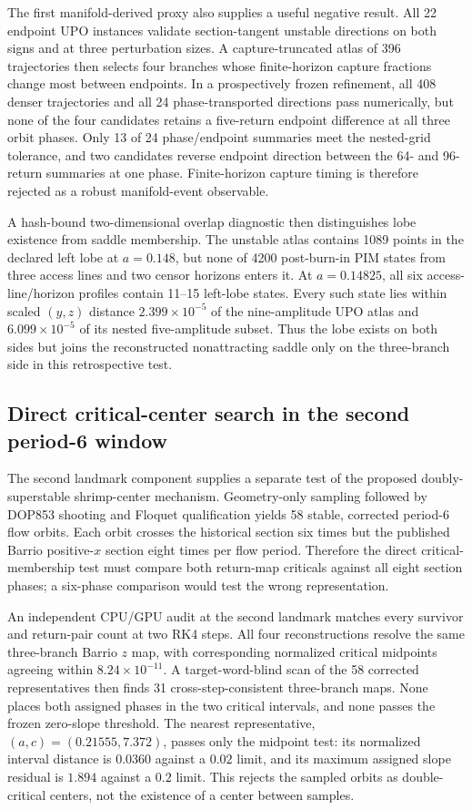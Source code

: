 The first manifold-derived proxy also supplies a useful negative result.  All
22 endpoint UPO instances validate section-tangent unstable directions on both
signs and at three perturbation sizes.  A capture-truncated atlas of 396
trajectories then selects four branches whose finite-horizon capture fractions
change most between endpoints.  In a prospectively frozen refinement, all 408
denser trajectories and all 24 phase-transported directions pass numerically,
but none of the four candidates retains a five-return endpoint difference at
all three orbit phases.  Only 13 of 24 phase/endpoint summaries meet the
nested-grid tolerance, and two candidates reverse endpoint direction between
the 64- and 96-return summaries at one phase.  Finite-horizon capture timing is
therefore rejected as a robust manifold-event observable.

A hash-bound two-dimensional overlap diagnostic then distinguishes lobe
existence from saddle membership.  The unstable atlas contains 1089 points in
the declared left lobe at $a=0.148$, but none of 4200 post-burn-in PIM states
from three access lines and two censor horizons enters it.  At $a=0.14825$,
all six access-line/horizon profiles contain 11--15 left-lobe states.  Every
such state lies within scaled $(y,z)$ distance $2.399\times10^{-5}$ of the
nine-amplitude UPO atlas and $6.099\times10^{-5}$ of its nested five-amplitude
subset.  Thus the lobe exists on both sides but joins the reconstructed
nonattracting saddle only on the three-branch side in this retrospective test.

\subsection{Direct critical-center search in the second period-6 window}

The second landmark component supplies a separate test of the proposed
doubly-superstable shrimp-center mechanism.  Geometry-only sampling followed
by DOP853 shooting and Floquet qualification yields 58 stable, corrected
period-6 flow orbits.  Each orbit crosses the historical section six times but
the published Barrio positive-$x$ section eight times per flow period.
Therefore the direct critical-membership test must compare both return-map
criticals against all eight section phases; a six-phase comparison would test
the wrong representation.

An independent CPU/GPU audit at the second landmark matches every survivor and
return-pair count at two RK4 steps.  All four reconstructions resolve the same
three-branch Barrio $z$ map, with corresponding normalized critical midpoints
agreeing within $8.24\times10^{-11}$.  A target-word-blind scan of the 58
corrected representatives then finds 31 cross-step-consistent three-branch
maps.  None places both assigned phases in the two critical intervals, and
none passes the frozen zero-slope threshold.  The nearest representative,
$(a,c)=(0.21555,7.372)$, passes only the midpoint test: its normalized
interval distance is $0.0360$ against a $0.02$ limit, and its maximum assigned
slope residual is $1.894$ against a $0.2$ limit.  This rejects the sampled
orbits as double-critical centers, not the existence of a center between
samples.

